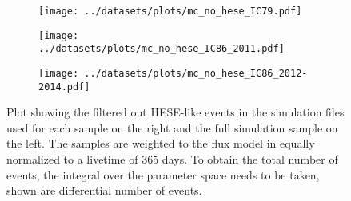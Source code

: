 \begin{figure}[htbp]
  \centering
  \begin{subfigure}[t]{\textwidth}
    \centering
    \texttt{[image: ../datasets/plots/mc\_no\_hese\_IC79.pdf]}
  \end{subfigure}
  \hfill
  \begin{subfigure}[t]{\textwidth}
    \centering
    \texttt{[image: ../datasets/plots/mc\_no\_hese\_IC86\_2011.pdf]}
  \end{subfigure}
  \hfill
  \begin{subfigure}[t]{\textwidth}
    \centering
    \texttt{[image: ../datasets/plots/mc\_no\_hese\_IC86\_2012-2014.pdf]}
  \end{subfigure}
  \caption[HESE decorrelation for IC79, IC86'11, IC86'12--'14]{
    Plot showing the filtered out HESE-like events in the simulation files used for each sample on the right and the full simulation sample on the left.
    The samples are weighted to the flux model in \cite{Haack:2017dxi} equally normalized to a livetime of $365$ days.
    To obtain the total number of events, the integral over the parameter space needs to be taken, shown are differential number of events.
    }
  \label{fig:mc_no_hese_79_86I_86II}
\end{figure}
